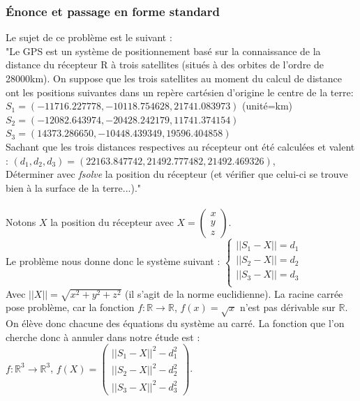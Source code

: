 \documentclass[a4paper,10pt]{report}
\begin{document}
\subsubsection{Énonce et passage en forme standard}
Le sujet de ce problème est le suivant :\\
\indent "Le GPS est un système de positionnement basé sur la connaissance de la distance du récepteur R à trois satellites (situés à des orbites de l’ordre de 	28000km). On suppose que les trois satellites au moment du calcul de distance ont les positions suivantes dans un repère cartésien d’origine le centre de la terre:\\
$S_1 = (-11716.227778, -10118.754628, 21741.083973)$ (unité=km)\\
$S_2 = (-12082.643974, -20428.242179, 11741.374154)$\\
$S_3 = (14373.286650, -10448.439349, 19596.404858)$\\
Sachant que les trois distances respectives au récepteur ont été calculées et valent : $(d_1, d_2, d_3) = (22163.847742, 21492.777482, 21492.469326)$,\\
Déterminer avec \textit{fsolve} la position du récepteur (et vérifier que celui-ci se trouve bien à la surface de la terre...)."\\
\\
\indent Notons $X$ la position du récepteur avec $X= \left( \begin{array}{c} x \\ y \\ z \end{array} \right)$.\\
Le problème nous donne donc le système suivant :
$
\left\lbrace
\begin{array}{l}
||S_1-X||=d_1\\
||S_2-X||=d_2\\
||S_3-X||=d_3\\
\end{array}\right.
$\\
Avec $||X||=\sqrt{x^2+y^2+z^2}$ (il s'agit de la norme euclidienne). La racine carrée pose problème, car la fonction $f : \mathbb{R} \longrightarrow \mathbb{R}$, $f(x)=\sqrt{x}$ n'est pas dérivable sur $\mathbb{R}$. On élève donc chacune des équations du système au carré.
La fonction que l'on cherche donc à annuler dans notre étude est :\\
$f: \mathbb{R}^3 \longrightarrow \mathbb{R}^3$, $f(X)=\left( \begin{array}{c} ||S_1-X||^2-d_1^2 \\ ||S_2-X||^2-d_2^2 \\ ||S_3-X||^2-d_3^2 \end{array} \right)$.\\ \\
\end{document}
